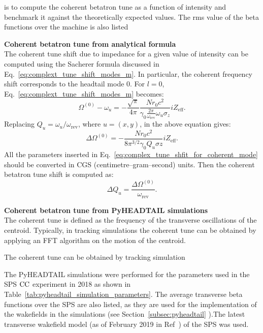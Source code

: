 is to compute the coherent betatron tune as a function of intensity and benchmark it against the theoretically expected values. The rms value of the beta functions over the machine is also listed 

\textbf{Coherent betatron tune from analytical formula}\\
The coherent tune shift due to impedance for a given value of intensity can be computed using the Sacherer formula discussed in Eq.~\eqref{eq:complext_tune_shift_modes_m}. In particular, the coherent frequency shift corresponds to the headtail mode 0. For $l=0$, Eq.~\eqref{eq:complext_tune_shift_modes_m} becomes:
\begin{equation}
    \Omega^{(0)} - \omega_u = - \frac{\sqrt{\pi}}{4 \pi}\frac{N r_0 c^2}{\gamma_0 \frac{2\pi}{\omega_\mathrm{rev}}\omega_u \sigma_z} i Z_\mathrm{eff}.
\end{equation}
Replacing $Q_u = \omega_u/\omega_\mathrm{rev}$, where $u=(x,y)$, in the above equation gives:
\begin{equation}\label{eq:complex_tune_shfit_for_coherent_mode}
    \Delta \Omega^{(0)} = - \frac{N r_0 c^2}{8 \pi^{3/2} \gamma_0 Q_u \sigma z} i Z_\mathrm{eff}.
\end{equation}
All the parameters inserted in Eq.~\eqref{eq:complex_tune_shfit_for_coherent_mode} should be converted in CGS (centimetre–gram–second) units.
Then the coherent betatron tune shift is computed as:
\begin{equation}
    \Delta Q_u = \frac{\Delta \Omega^{(0)}}{\omega_\mathrm{rev}}.
\end{equation}

\textbf{Coherent betatron tune from PyHEADTAIL simulations}\\
   \label{tab:pyheadtail_simulation_parameters}
The coherent tune is defined as the frequency of the transverse oscillations of the centroid.
Typically, in tracking simulations the coherent tune can be obtained by applying an FFT algorithm on the motion of the centroid.


The coherent tune can be obtained by tracking simulation 



The PyHEADTAIL simulations were performed for the parameters used in the SPS ${\mathrm{CC}}$ experiment in 2018 as shown in Table~\ref{tab:pyheadtail_simulation_parameters}. The average transverse beta functions over the SPS are also listed, as they are used for the implementation of the wakefields in the simulations (see Section~\ref{subsec:pyheadtail} ).The latest transverse wakefield model (as of February 2019 in Ref~\cite{sps_impedance_model_git}) of the SPS was used.







